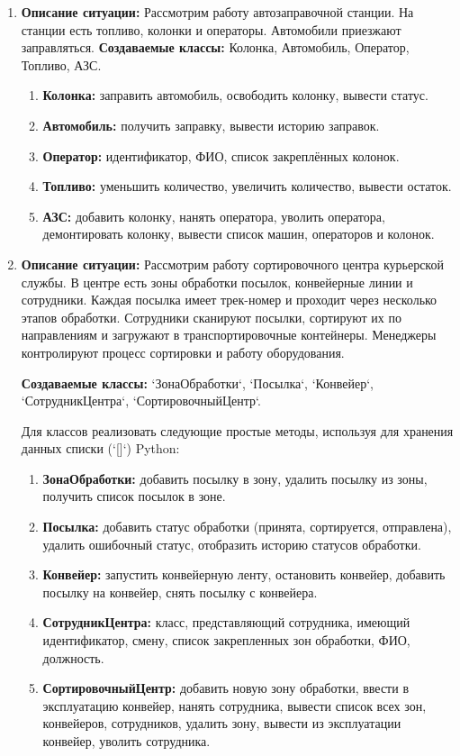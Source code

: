 \begin{enumerate}
\item
\textbf{Описание ситуации:}
Рассмотрим работу автозаправочной станции. На станции есть топливо, 
колонки и операторы. Автомобили приезжают заправляться.
\textbf{Создаваемые классы:} Колонка, Автомобиль, Оператор, Топливо, АЗС.
\begin{enumerate}
    \item \textbf{Колонка:} заправить автомобиль, освободить колонку, вывести статус.
    \item \textbf{Автомобиль:} получить заправку, вывести историю заправок.
    \item \textbf{Оператор:} идентификатор, ФИО, список закреплённых колонок.
    \item \textbf{Топливо:} уменьшить количество, увеличить количество, вывести остаток.
    \item \textbf{АЗС:} добавить колонку, нанять оператора, уволить оператора, демонтировать колонку, 
    вывести список машин, операторов и колонок.
\end{enumerate}


\item \textbf{Описание ситуации:} Рассмотрим работу сортировочного центра курьерской службы. 
В центре есть зоны обработки посылок, конвейерные линии и сотрудники. 
Каждая посылка имеет трек-номер и проходит через несколько этапов обработки. 
Сотрудники сканируют посылки, сортируют их по направлениям и загружают в 
транспортировочные контейнеры. Менеджеры контролируют процесс сортировки и работу оборудования.

\textbf{Создаваемые классы:} `ЗонаОбработки`, `Посылка`, `Конвейер`, `СотрудникЦентра`, `СортировочныйЦентр`.

Для классов реализовать следующие простые методы, используя для хранения данных списки (`[]`) Python:
\begin{enumerate}
    \item \textbf{ЗонаОбработки:} добавить посылку в зону, удалить посылку из зоны, 
    получить список посылок в зоне.
    \item \textbf{Посылка:} добавить статус обработки (принята, сортируется, отправлена), 
    удалить ошибочный статус, отобразить историю статусов обработки.
    \item \textbf{Конвейер:} запустить конвейерную ленту, остановить конвейер, 
    добавить посылку на конвейер, снять посылку с конвейера.
    \item \textbf{СотрудникЦентра:} класс, представляющий сотрудника, имеющий идентификатор, 
    смену, список закрепленных зон обработки, ФИО, должность.
    \item \textbf{СортировочныйЦентр:} добавить новую зону обработки, 
    ввести в эксплуатацию конвейер, нанять сотрудника, вывести список всех зон, конвейеров, 
    сотрудников, удалить зону, вывести из эксплуатации конвейер, уволить сотрудника.
\end{enumerate}


\end{enumerate}
